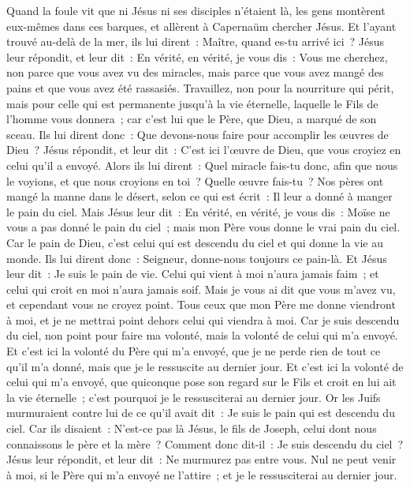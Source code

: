 \begin{multicols}{2}
Quand la foule vit que ni Jésus ni ses disciples n'étaient là, les gens montèrent eux-mêmes dans ces barques, et allèrent à Capernaüm chercher Jésus.
Et l'ayant trouvé au-delà de la mer, ils lui dirent~: Maître, quand es-tu arrivé ici~?
Jésus leur répondit, et leur dit~: En vérité, en vérité, je vous dis~: Vous me cherchez, non parce que vous avez vu des miracles, mais parce que vous avez mangé des pains et que vous avez été rassasiés.
Travaillez, non pour la nourriture qui périt, mais pour celle qui est permanente jusqu'à la vie éternelle, laquelle le Fils de l'homme vous donnera~; car c'est lui que le Père, que Dieu, a marqué de son sceau.
Ils lui dirent donc~: Que devons-nous faire pour accomplir les œuvres de Dieu~?
Jésus répondit, et leur dit~: C'est ici l'œuvre de Dieu, que vous croyiez en celui qu'il a envoyé.
Alors ils lui dirent~: Quel miracle fais-tu donc, afin que nous le voyions, et que nous croyions en toi~? Quelle œuvre fais-tu~?
Nos pères ont mangé la manne dans le désert, selon ce qui est écrit~: Il leur a donné à manger le pain du ciel.
Mais Jésus leur dit~: En vérité, en vérité, je vous dis~: Moïse ne vous a pas donné le pain du ciel~; mais mon Père vous donne le vrai pain du ciel.
Car le pain de Dieu, c'est celui qui est descendu du ciel et qui donne la vie au monde.
Ils lui dirent donc~: Seigneur, donne-nous toujours ce pain-là.
Et Jésus leur dit~: Je suis le pain de vie. Celui qui vient à moi n'aura jamais faim~; et celui qui croit en moi n'aura jamais soif.
Mais je vous ai dit que vous m'avez vu, et cependant vous ne croyez point.
Tous ceux que mon Père me donne viendront à moi, et je ne mettrai point dehors celui qui viendra à moi.
Car je suis descendu du ciel, non point pour faire ma volonté, mais la volonté de celui qui m'a envoyé.
Et c'est ici la volonté du Père qui m'a envoyé, que je ne perde rien de tout ce qu'il m'a donné, mais que je le ressuscite au dernier jour.
Et c'est ici la volonté de celui qui m'a envoyé, que quiconque pose son regard sur le Fils et croit en lui ait la vie éternelle~; c'est pourquoi je le ressusciterai au dernier jour.
Or les Juifs murmuraient contre lui de ce qu'il avait dit~: Je suis le pain qui est descendu du ciel.
Car ils disaient~: N'est-ce pas là Jésus, le fils de Joseph, celui dont nous connaissons le père et la mère~? Comment donc dit-il~: Je suis descendu du ciel~?
Jésus leur répondit, et leur dit~: Ne murmurez pas entre vous.
Nul ne peut venir à moi, si le Père qui m'a envoyé ne l'attire~; et je le ressusciterai au dernier jour.

\end{multicols}
